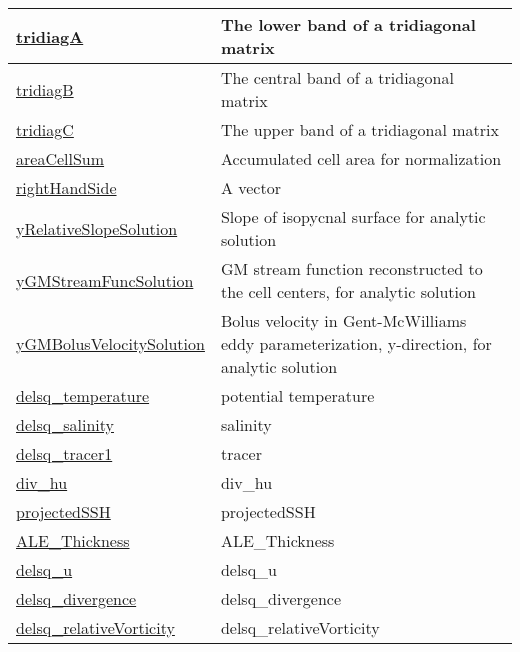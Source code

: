 {\begin{center}
\begin{longtable}{| p{2.0in} | p{4.0in} |}
    \hline
    \hyperref[subsec:var_sec_scratch_tridiagA]{tridiagA} & The lower band of a tridiagonal matrix \\
    \hline
    \hyperref[subsec:var_sec_scratch_tridiagB]{tridiagB} & The central band of a tridiagonal matrix \\
    \hline
    \hyperref[subsec:var_sec_scratch_tridiagC]{tridiagC} & The upper band of a tridiagonal matrix \\
    \hline
    \hyperref[subsec:var_sec_scratch_areaCellSum]{areaCellSum} & Accumulated cell area for normalization \\
    \hline
    \hyperref[subsec:var_sec_scratch_rightHandSide]{rightHandSide} & A vector \\
    \hline
    \hyperref[subsec:var_sec_scratch_yRelativeSlopeSolution]{yRelativeSlopeSolution} & Slope of isopycnal surface for analytic solution \\
    \hline
    \hyperref[subsec:var_sec_scratch_yGMStreamFuncSolution]{yGMStreamFuncSolution} & GM stream function reconstructed to the cell centers, for analytic solution \\
    \hline
    \hyperref[subsec:var_sec_scratch_yGMBolusVelocitySolution]{yGMBolusVelocitySolution} & Bolus velocity in Gent-McWilliams eddy parameterization, y-direction, for analytic solution \\
    \hline
    \hyperref[subsec:var_sec_scratch_delsq_temperature]{delsq\_temperature} & potential temperature \\
    \hline
    \hyperref[subsec:var_sec_scratch_delsq_salinity]{delsq\_salinity} & salinity \\
    \hline
    \hyperref[subsec:var_sec_scratch_delsq_tracer1]{delsq\_tracer1} & tracer \\
    \hline
    \hyperref[subsec:var_sec_scratch_div_hu]{div\_hu} & div\_hu \\
    \hline
    \hyperref[subsec:var_sec_scratch_projectedSSH]{projectedSSH} & projectedSSH \\
    \hline
    \hyperref[subsec:var_sec_scratch_ALE_Thickness]{ALE\_Thickness} & ALE\_Thickness \\
    \hline
    \hyperref[subsec:var_sec_scratch_delsq_u]{delsq\_u} & delsq\_u \\
    \hline
    \hyperref[subsec:var_sec_scratch_delsq_divergence]{delsq\_divergence} & delsq\_divergence \\
    \hline
    \hyperref[subsec:var_sec_scratch_delsq_relativeVorticity]{delsq\_relativeVorticity} & delsq\_relativeVorticity \\

\end{longtable}
\end{center}}
